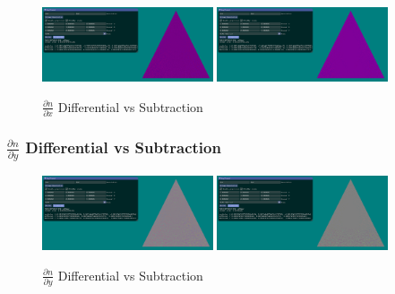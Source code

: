 \documentclass[12pt]{article}
\newcommand{\oneimgwidth}{0.45}
\newcommand{\dndx}{\frac{\partial n}{\partial x}}
\newcommand{\dndy}{\frac{\partial n}{\partial y}}
\begin{document}
\begin{figure}[htbp] 
	\centering
	\includegraphics[width=\oneimgwidth\textwidth]{dn/dndx.png}
	\includegraphics[width=\oneimgwidth\textwidth]{dn/dndx_sub.png}
	\caption{$\dndx$ Differential vs Subtraction}
	\label{fig:dndx}
\end{figure}

\FloatBarrier

\subsubsection{$\dndy$ Differential vs Subtraction}

\begin{figure}[htbp] 
	\centering
	\includegraphics[width=\oneimgwidth\textwidth]{dn/dndy.png}
	\includegraphics[width=\oneimgwidth\textwidth]{dn/dndy_sub.png}
	\caption{$\dndy$ Differential vs Subtraction}
	\label{fig:dndx}
\end{figure}
\end{document}
